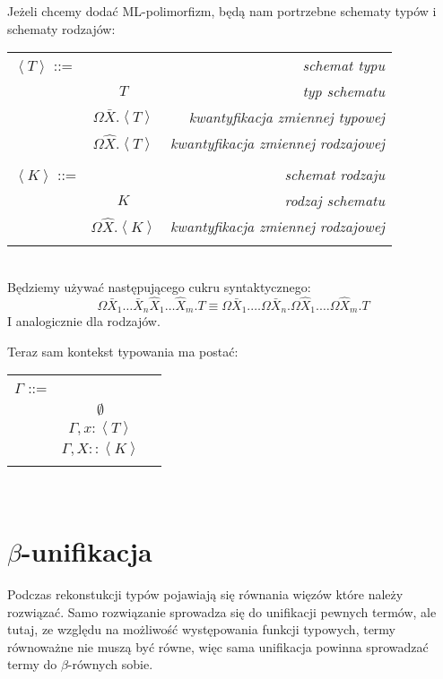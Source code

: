 \documentclass[11pt,leqno]{article}
\begin{document}
Jeżeli chcemy dodać ML-polimorfizm, będą nam portrzebne schematy typów i schematy rodzajów:

\begin{tabular}{| l c r |}
  \hline
  $\left<T\right>$ ::= &  & \textit{schemat typu} \\
   & $T$ & \textit{typ schematu} \\
   & $\Omega \bar{X}.\left<T\right>$ & \textit{kwantyfikacja zmiennej typowej} \\
   & $\Omega \widehat{X}.\left<T\right>$ & \textit{kwantyfikacja zmiennej rodzajowej} \\
   & & \\
  $\left<K\right>$ ::= &  & \textit{schemat rodzaju} \\
   & $K$ & \textit{rodzaj schematu}\\
   & $\Omega \widehat{X}.\left<K\right>$ & \textit{kwantyfikacja zmiennej rodzajowej} \\
   & & \\
  \hline
\end{tabular} \\

Będziemy używać następującego cukru syntaktycznego:
\[
\Omega \bar{X}_1 \dots \bar{X}_n \widehat{X}_1 \dots \widehat{X}_m.T \equiv 
\Omega \bar{X}_1. \dots \Omega \bar{X}_n. \Omega \widehat{X}_1. \dots \Omega \widehat{X}_m.T
\]
I analogicznie dla rodzajów.

Teraz sam kontekst typowania ma postać:

\begin{tabular}{| l c r |}
  \hline
  $\Gamma$ ::= &  & \\
   & $\emptyset$ & \\
   & $\Gamma, x:\left<T\right>$ & \\
   & $\Gamma, X::\left<K\right>$ & \\
   & & \\
  \hline
\end{tabular} \\

\section{$\beta$-unifikacja}

Podczas rekonstukcji typów pojawiają się równania więzów które należy rozwiązać. Samo rozwiązanie
sprowadza się do unifikacji pewnych termów, ale tutaj, ze względu na możliwość występowania funkcji
typowych, termy równoważne nie muszą być równe, więc sama unifikacja powinna sprowadzać termy do
$\beta$-równych sobie.
\end{document}
